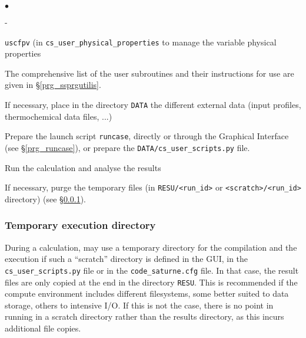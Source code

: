 {{{\begin{list}{$\bullet$}{}
\begin{list}{}{}
\begin{list}{}{}
\begin{list}{-}{}

           \item \texttt{uscfpv} (in \texttt{cs\_user\_physical\_properties} 
                  to manage the variable physical properties

        \end{list}
    \end{list}

\end{list}


The comprehensive list of the user subroutines and their instructions
      for use are given in \S\ref{prg_ssprgutilis}.

\item If necessary, place in the directory \texttt{DATA} the different
      external data (input profiles, thermochemical data files, ...)

\item Prepare the launch script \texttt{runcase}, directly or through the
      Graphical Interface (see \S\ref{prg_runcase}), or prepare the
      \texttt{DATA/cs\_user\_scripts.py} file.

\item Run the calculation and analyse the results

\item If necessary, purge the temporary files (in \texttt{RESU/<run\_id>} or
      \texttt{<scratch>/<run\_id>} directory) (see \S\ref{prg_temporarydirectory}).
\end{list}


\subsubsection{Temporary execution directory}
\label{prg_temporarydirectory}%
During a calculation, \CS may use a temporary directory for the compilation and
the execution if such a ``scratch'' directory is defined in the GUI, in the 
\texttt{cs\_user\_scripts.py} file or in the \texttt{code\_saturne.cfg} file. 
In that case, the result files are only copied at the end in the directory
\texttt{RESU}. This is recommended if the compute environment includes different
filesystems, some better suited to data storage, others to intensive I/O.
If this is not the case, there is no point in running in a scratch directory
rather than the results directory, as this incurs additional file copies.

}}}
